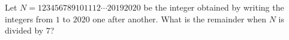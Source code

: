 Let $N=123456789101112\cdots20192020$ be the integer obtained by writing the integers from $1$ to $2020$ one after another. What is the remainder when $N$ is divided by $7$?
